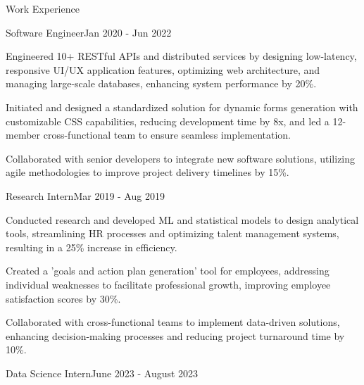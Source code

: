 \documentclass{resume} %
\begin{document}
    \begin{rSection}{Work Experience}
                    \begin{rSubsection}
                {Software Engineer}{Jan 2020 - Jun 2022}
                                    {}
                                {}
                                    \item Engineered 10+ RESTful APIs and distributed services by designing low{-}latency, responsive UI/UX application features, optimizing web architecture, and managing large{-}scale databases, enhancing system performance by 20\%.
                                    \item Initiated and designed a standardized solution for dynamic forms generation with customizable CSS capabilities, reducing development time by 8x, and led a 12{-}member cross{-}functional team to ensure seamless implementation.
                                    \item Collaborated with senior developers to integrate new software solutions, utilizing agile methodologies to improve project delivery timelines by 15\%.
                            \end{rSubsection}
                    \begin{rSubsection}
                {Research Intern}{Mar 2019 - Aug 2019}
                                    {}
                                {}
                                    \item Conducted research and developed ML and statistical models to design analytical tools, streamlining HR processes and optimizing talent management systems, resulting in a 25\% increase in efficiency.
                                    \item Created a 'goals and action plan generation' tool for employees, addressing individual weaknesses to facilitate professional growth, improving employee satisfaction scores by 30\%.
                                    \item Collaborated with cross{-}functional teams to implement data{-}driven solutions, enhancing decision{-}making processes and reducing project turnaround time by 10\%.
                            \end{rSubsection}
                    \begin{rSubsection}
                {Data Science Intern}{June 2023 - August 2023}

\end{rSubsection}
\end{rSection}
\end{document}

